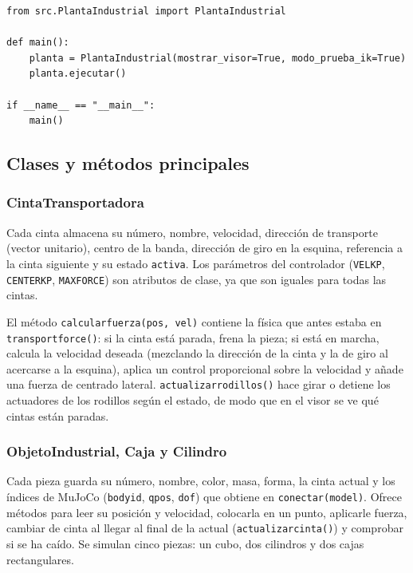 \documentclass[12pt,a4paper]{article}
\renewcommand{\_}{\guionbajo\allowbreak}
\begin{document}
\begin{lstlisting}[caption={\texttt{main.py}: el programa principal queda separado de la lógica.}]
from src.PlantaIndustrial import PlantaIndustrial

def main():
    planta = PlantaIndustrial(mostrar_visor=True, modo_prueba_ik=True)
    planta.ejecutar()

if __name__ == "__main__":
    main()
\end{lstlisting}
\clearpage
\subsection{Clases y métodos principales}

\subsubsection{CintaTransportadora}

Cada cinta almacena su número, nombre, velocidad, dirección de transporte (vector
unitario), centro de la banda, dirección de giro en la esquina, referencia a la cinta
siguiente y su estado \texttt{activa}. Los parámetros del controlador (\texttt{VEL\_KP},
\texttt{CENTER\_KP}, \texttt{MAX\_FORCE}) son atributos de clase, ya que son iguales para
todas las cintas.

El método \texttt{calcular\_fuerza(pos, vel)} contiene la física que antes estaba en
\texttt{transport\_force()}: si la cinta está parada, frena la pieza; si está en marcha,
calcula la velocidad deseada (mezclando la dirección de la cinta y la de giro al acercarse
a la esquina), aplica un control proporcional sobre la velocidad y añade una fuerza de
centrado lateral. \texttt{actualizar\_rodillos()} hace girar o detiene los actuadores de
los rodillos según el estado, de modo que en el visor se ve qué cintas están paradas.

\subsubsection{ObjetoIndustrial, Caja y Cilindro}

Cada pieza guarda su número, nombre, color, masa, forma, la cinta actual y los índices de
MuJoCo (\texttt{body\_id}, \texttt{\_qpos}, \texttt{\_dof}) que obtiene en
\texttt{conectar(model)}. Ofrece métodos para leer su posición y velocidad, colocarla en un
punto, aplicarle fuerza, cambiar de cinta al llegar al final de la actual
(\texttt{actualizar\_cinta()}) y comprobar si se ha caído. Se simulan cinco piezas: un
cubo, dos cilindros y dos cajas rectangulares.
\clearpage
\end{document}

